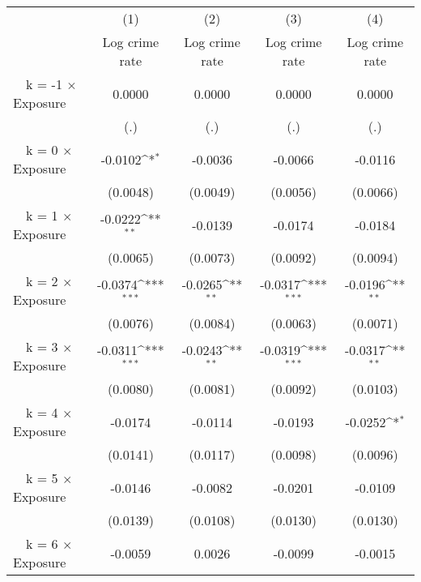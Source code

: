 {
\def\sym#1{\ifmmode^{#1}\else\(^{#1}\)\fi}
\begin{tabular}{l*{4}{c}}
\toprule
                &\multicolumn{1}{c}{(1)}&\multicolumn{1}{c}{(2)}&\multicolumn{1}{c}{(3)}&\multicolumn{1}{c}{(4)}\\
                &\multicolumn{1}{c}{Log crime rate}&\multicolumn{1}{c}{Log crime rate}&\multicolumn{1}{c}{Log crime rate}&\multicolumn{1}{c}{Log crime rate}\\
\midrule
~~k = -1 $\times$ Exposure&   0.0000         &   0.0000         &   0.0000         &   0.0000         \\
                &      (.)         &      (.)         &      (.)         &      (.)         \\
\addlinespace
~~k = 0 $\times$ Exposure&  -0.0102\sym{*}  &  -0.0036         &  -0.0066         &  -0.0116         \\
                & (0.0048)         & (0.0049)         & (0.0056)         & (0.0066)         \\
\addlinespace
~~k = 1 $\times$ Exposure&  -0.0222\sym{**} &  -0.0139         &  -0.0174         &  -0.0184         \\
                & (0.0065)         & (0.0073)         & (0.0092)         & (0.0094)         \\
\addlinespace
~~k = 2 $\times$ Exposure&  -0.0374\sym{***}&  -0.0265\sym{**} &  -0.0317\sym{***}&  -0.0196\sym{**} \\
                & (0.0076)         & (0.0084)         & (0.0063)         & (0.0071)         \\
\addlinespace
~~k = 3 $\times$ Exposure&  -0.0311\sym{***}&  -0.0243\sym{**} &  -0.0319\sym{***}&  -0.0317\sym{**} \\
                & (0.0080)         & (0.0081)         & (0.0092)         & (0.0103)         \\
\addlinespace
~~k = 4 $\times$ Exposure&  -0.0174         &  -0.0114         &  -0.0193         &  -0.0252\sym{*}  \\
                & (0.0141)         & (0.0117)         & (0.0098)         & (0.0096)         \\
\addlinespace
~~k = 5 $\times$ Exposure&  -0.0146         &  -0.0082         &  -0.0201         &  -0.0109         \\
                & (0.0139)         & (0.0108)         & (0.0130)         & (0.0130)         \\
\addlinespace
~~k = 6 $\times$ Exposure&  -0.0059         &   0.0026         &  -0.0099         &  -0.0015         \\

\end{tabular}}
